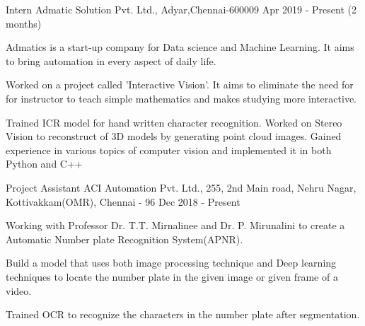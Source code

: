 

\begin{cventries}

 \cventry
    {Intern} %
    {Admatic Solution Pvt. Ltd.,} %
    {Adyar,Chennai-600009} %
    {Apr 2019 - Present (2 months)} %
    {
      \begin{cvitems} %
        \item {Admatics is a start-up company for Data science and Machine Learning. It aims to bring automation in every aspect of daily life.}
        \item {Worked on a project called 'Interactive Vision'. It aims to eliminate the need for for 
        instructor to teach simple mathematics and makes studying more interactive.}
        \item {Trained ICR model for hand written character recognition. Worked on Stereo Vision to  reconstruct of 3D models by generating point cloud images. Gained experience in various topics of computer vision and implemented it in both Python and C++  }
      \end{cvitems}
    }


  \cventry
    {Project Assistant} %
    {ACI Automation Pvt. Ltd.,} %
    {255, 2nd Main road, Nehru Nagar,
Kottivakkam(OMR),
Chennai - 96} %
    {Dec 2018 - Present} %
    {
      \begin{cvitems} %
        \item {Working with Professor Dr. T.T. Mirnalinee and Dr. P. Mirunalini to create a Automatic Number plate Recognition System(APNR).}
        \item {Build a model that uses both image processing technique and Deep learning techniques to locate the number plate in the given image or given frame of a video.}
        \item {Trained OCR to recognize the characters in the number plate after segmentation. }
      \end{cvitems}
    }
    
\end{cventries}